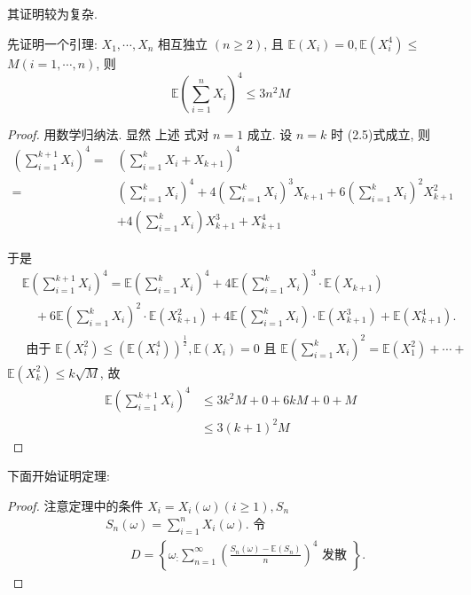 其证明较为复杂. 

{
    \small
    先证明一个引理: 
         $X_1, \cdots, X_n$ 相互独立 $(n \geqslant 2)$, 且 $\mathbb{E}\left(X_i\right)=0, \mathbb{E}\left(X_i^4\right) \leq$ $M(i=1, \cdots, n)$, 则
$$
\mathbb{E}\left(\sum_{i=1}^n X_i\right)^4 \leq 3 n^2 M
$$
\begin{proof}
     用数学归纳法. 显然 上述 式对 $n=1$ 成立. 设 $n=k$ 时 (2.5)式成立, 则
$$
\begin{aligned}
\left(\sum_{i=1}^{k+1} X_i\right)^4= & \left(\sum_{i=1}^k X_i+X_{k+1}\right)^4 \\
= & \left(\sum_{i=1}^k X_i\right)^4+4\left(\sum_{i=1}^k X_i\right)^3 X_{k+1}+6\left(\sum_{i=1}^k X_i\right)^2 X_{k+1}^2 \\
& +4\left(\sum_{i=1}^k X_i\right) X_{k+1}^3+X_{k+1}^4
\end{aligned}
$$

于是
$$
\begin{aligned}
& \mathbb{E}\left(\sum_{i=1}^{k+1} X_i\right)^4=\mathbb{E}\left(\sum_{i=1}^k X_i\right)^4+4 \mathbb{E}\left(\sum_{i=1}^k X_i\right)^3 \cdot \mathbb{E}\left(X_{k+1}\right) \\
& \quad+6 \mathbb{E}\left(\sum_{i=1}^k X_i\right)^2 \cdot \mathbb{E}\left(X_{k+1}^2\right)+4 \mathbb{E}\left(\sum_{i=1}^k X_i\right) \cdot \mathbb{E}\left(X_{k+1}^3\right)+\mathbb{E}\left(X_{k+1}^4\right) . \\
& \text { 由于 } \mathbb{E}\left(X_i^2\right) \leq\left(\mathbb{E}\left(X_i^4\right)\right)^{\frac{1}{2}}, \mathbb{E}\left(X_i\right)=0 \text { 且 } \mathbb{E}\left(\sum_{i=1}^k X_i\right)^2=\mathbb{E}\left(X_1^2\right)+\cdots+
\end{aligned}
$$
$\mathbb{E}\left(X_k^2\right) \leq k \sqrt{M}$, 故
$$
\begin{aligned}
\mathbb{E}\left(\sum_{i=1}^{k+1} X_i\right)^4 & \leq 3 k^2 M+0+6 k M+0+M \\
& \leq 3(k+1)^2 M
\end{aligned}
$$
\end{proof}

下面开始证明定理: 
\begin{proof}
    注意定理中的条件 $X_i=X_i(\omega)(i \geqslant 1), S_n$
$$
\begin{aligned}
& S_n(\omega)=\sum_{i=1}^n X_i(\omega) \text {. 令 } \\
& \qquad D=\left\{\omega_{:} \sum_{n=1}^{\infty}\left(\frac{S_n(\omega)-\mathbb{E}\left(S_n\right)}{n}\right)^4 \text { 发散 }\right\} .
\end{aligned}
$$


\end{proof}}
